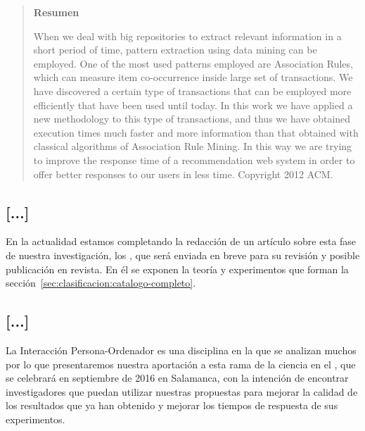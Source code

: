 \begin{quotation}
	\noindent\textbf{Resumen}

	\nopagebreak When we deal with big repositories to extract relevant information in a short period of time, pattern extraction using data mining can be employed. One of the most used patterns employed are Association Rules, which can measure item co-occurrence inside large set of transactions. We have discovered a certain type of transactions that can be employed more efficiently that have been used until today. In this work we have applied a new methodology to this type of transactions, and thus we have obtained execution times much faster and more information than that obtained with classical algorithms of Association Rule Mining. In this way we are trying to improve the response time of a recommendation web system in order to offer better responses to our users in less time. Copyright 2012 ACM.
\end{quotation}








\subsection*{[...]}
\label{sec:clasificacion:publicaciones:articulo}
En la actualidad estamos completando la redacción de un artículo sobre esta fase de nuestra investigación, los \CCs, que será enviada en breve para su revisión y posible publicación en revista. En él se exponen la teoría y experimentos que forman la sección~\ref{sec:clasificacion:catalogo-completo}.




\subsection*{[...]}
\label{sec:clasificacion:publicaciones:interaccion-2016}
La Interacción Persona-Ordenador es una disciplina en la que se analizan muchos \catalogos por lo que presentaremos nuestra aportación a esta rama de la ciencia en el , que se celebrará en septiembre de 2016 en Salamanca, con la intención de encontrar investigadores que puedan utilizar nuestras propuestas para mejorar la calidad de los resultados que ya han obtenido y mejorar los tiempos de respuesta de sus experimentos.

